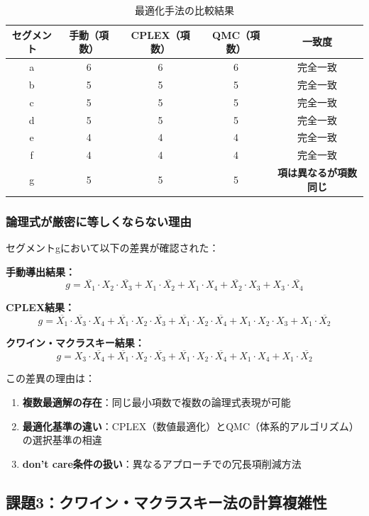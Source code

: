 \documentclass[a4j,dvipdfmx]{jsarticle}
\begin{document}
\begin{table}[H]
\centering
\caption{最適化手法の比較結果}
\label{tab:comparison}
\begin{tabular}{|c|c|c|c|c|}
\hline
セグメント & 手動（項数） & CPLEX（項数） & QMC（項数） & 一致度 \\
\hline
a & 6 & 6 & 6 & 完全一致 \\
b & 5 & 5 & 5 & 完全一致 \\
c & 5 & 5 & 5 & 完全一致 \\
d & 5 & 5 & 5 & 完全一致 \\
e & 4 & 4 & 4 & 完全一致 \\
f & 4 & 4 & 4 & 完全一致 \\
g & 5 & 5 & 5 & \textbf{項は異なるが項数同じ} \\
\hline
\end{tabular}
\end{table}

\subsubsection{論理式が厳密に等しくならない理由}

セグメントgにおいて以下の差異が確認された：

\textbf{手動導出結果：}
$$g = \overline{X_1} \cdot X_2 \cdot \overline{X_3} + X_1 \cdot \overline{X_2} + X_1 \cdot X_4 + \overline{X_2} \cdot X_3 + X_3 \cdot \overline{X_4}$$

\textbf{CPLEX結果：}
$$g = \overline{X_1} \cdot \overline{X_3} \cdot X_4 + \overline{X_1} \cdot X_2 \cdot \overline{X_3} + \overline{X_1} \cdot X_2 \cdot \overline{X_4} + X_1 \cdot X_2 \cdot X_3 + X_1 \cdot \overline{X_2}$$


\textbf{クワイン・マクラスキー結果：}
$$g = X_3 \cdot \overline{X_4} + \overline{X_1} \cdot X_2 \cdot \overline{X_3} + \overline{X_1} \cdot X_2 \cdot \overline{X_4} + X_1 \cdot X_4 + X_1 \cdot \overline{X_2}$$


この差異の理由は：
\begin{enumerate}
\item \textbf{複数最適解の存在}：同じ最小項数で複数の論理式表現が可能
\item \textbf{最適化基準の違い}：CPLEX（数値最適化）とQMC（体系的アルゴリズム）の選択基準の相違
\item \textbf{don't care条件の扱い}：異なるアプローチでの冗長項削減方法
\end{enumerate}

\subsection{課題3：クワイン・マクラスキー法の計算複雑性}
\end{document}
